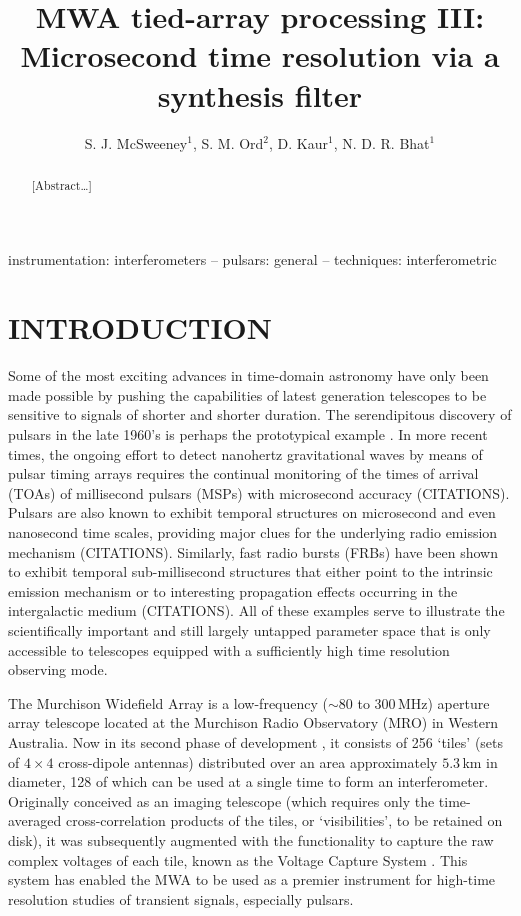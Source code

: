 \documentclass{pasa}%
\title[MWA tied-array processing III]{MWA tied-array processing III: Microsecond time resolution via a synthesis filter}
\author[McSweeney et al.]{S. J. McSweeney$^1$, S. M. Ord$^2$, D. Kaur$^1$, N. D. R. Bhat$^1$
\affil{$^1$International Centre for Radio Astronomy Research (ICRAR), GPO Box U1987, Perth, WA 6845, Australia}%
\affil{$^2$CSIRO Astronomy and Space Science, PO Box 76, Epping, NSW 1710, Australia}
}
\begin{document}
\begin{frontmatter}
\maketitle

\begin{abstract}
[Abstract\dots]
\end{abstract}

\begin{keywords}
    instrumentation: interferometers -- pulsars: general -- techniques: interferometric
\end{keywords}
\end{frontmatter}


\section{INTRODUCTION}
\label{sec:intro}

Some of the most exciting advances in time-domain astronomy have only been made possible by pushing the capabilities of latest generation telescopes to be sensitive to signals of shorter and shorter duration.
The serendipitous discovery of pulsars in the late 1960's is perhaps the prototypical example \citep{Hewish1968}.
In more recent times, the ongoing effort to detect nanohertz gravitational waves by means of pulsar timing arrays requires the continual monitoring of the times of arrival (TOAs) of millisecond pulsars (MSPs) with microsecond accuracy (CITATIONS).
Pulsars are also known to exhibit temporal structures on microsecond and even nanosecond time scales, providing major clues for the underlying radio emission mechanism (CITATIONS).
Similarly, fast radio bursts (FRBs) have been shown to exhibit temporal sub-millisecond structures that either point to the intrinsic emission mechanism or to interesting propagation effects occurring in the intergalactic medium (CITATIONS).
All of these examples serve to illustrate the scientifically important and still largely untapped parameter space that is only accessible to telescopes equipped with a sufficiently high time resolution observing mode.

The Murchison Widefield Array \citep[MWA;][]{Tingay2013} is a low-frequency ($\sim80$ to $300\,$MHz) aperture array telescope located at the Murchison Radio Observatory (MRO) in Western Australia.
Now in its second phase of development \citep[Phase II;][]{Wayth2018}, it consists of 256 `tiles' (sets of $4\times4$ cross-dipole antennas) distributed over an area approximately $5.3\,$km in diameter, 128 of which can be used at a single time to form an interferometer.
Originally conceived as an imaging telescope (which requires only the time-averaged cross-correlation products of the tiles, or `visibilities', to be retained on disk), it was subsequently augmented with the functionality to capture the raw complex voltages of each tile, known as the Voltage Capture System \citep[VCS;][]{Tremblay2015}.
This system has enabled the MWA to be used as a premier instrument for high-time resolution studies of transient signals, especially pulsars.
\end{document}
